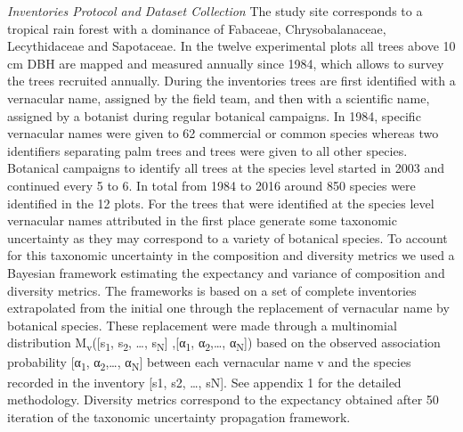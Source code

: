 \documentclass[fleqn,10pt]{ArtEcoFoG} %
\begin{document}
\emph{Inventories Protocol and Dataset Collection} The study site
corresponds to a tropical rain forest with a dominance of Fabaceae,
Chrysobalanaceae, Lecythidaceae and Sapotaceae. In the twelve
experimental plots all trees above 10 cm DBH are mapped and measured
annually since 1984, which allows to survey the trees recruited
annually. During the inventories trees are first identified with a
vernacular name, assigned by the field team, and then with a scientific
name, assigned by a botanist during regular botanical campaigns. In
1984, specific vernacular names were given to 62 commercial or common
species whereas two identifiers separating palm trees and trees were
given to all other species. Botanical campaigns to identify all trees at
the species level started in 2003 and continued every 5 to 6. In total
from 1984 to 2016 around 850 species were identified in the 12 plots.
For the trees that were identified at the species level vernacular names
attributed in the first place generate some taxonomic uncertainty as
they may correspond to a variety of botanical species. To account for
this taxonomic uncertainty in the composition and diversity metrics we
used a Bayesian framework estimating the expectancy and variance of
composition and diversity metrics. The frameworks is based on a set of
complete inventories extrapolated from the initial one through the
replacement of vernacular name by botanical species. These replacement
were made through a multinomial distribution
M\textsubscript{v}({[}s\textsubscript{1}, s\textsubscript{2}, \ldots{},
s\textsubscript{N}{]} ,{[}α\textsubscript{1},
α\textsubscript{2},\ldots{}, α\textsubscript{N}{]}) based on the
observed association probability {[}α\textsubscript{1},
α\textsubscript{2},\ldots{}, α\textsubscript{N}{]} between each
vernacular name v and the species recorded in the inventory {[}s1, s2,
\ldots{}, sN{]}. See appendix 1 for the detailed methodology. Diversity
metrics correspond to the expectancy obtained after 50 iteration of the
taxonomic uncertainty propagation framework.
\end{document}
